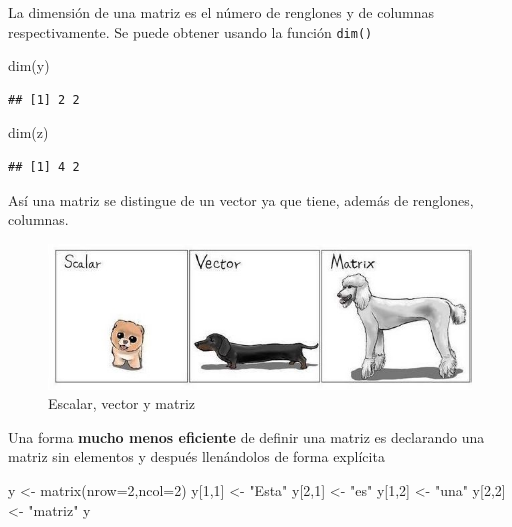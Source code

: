 \documentclass[
]{book}
\newenvironment{Shaded}{\begin{snugshade}}{\end{snugshade}}
\newcommand{\AttributeTok}[1]{\textcolor[rgb]{0.77,0.63,0.00}{#1}}
\newcommand{\DecValTok}[1]{\textcolor[rgb]{0.00,0.00,0.81}{#1}}
\newcommand{\FunctionTok}[1]{\textcolor[rgb]{0.00,0.00,0.00}{#1}}
\newcommand{\NormalTok}[1]{#1}
\newcommand{\OtherTok}[1]{\textcolor[rgb]{0.56,0.35,0.01}{#1}}
\newcommand{\StringTok}[1]{\textcolor[rgb]{0.31,0.60,0.02}{#1}}
\begin{document}
La dimensión de una matriz es el número de renglones y de columnas respectivamente. Se puede obtener usando
la función \texttt{dim()}

\begin{Shaded}
\begin{Highlighting}[]
\FunctionTok{dim}\NormalTok{(y)}
\end{Highlighting}
\end{Shaded}

\begin{verbatim}
## [1] 2 2
\end{verbatim}

\begin{Shaded}
\begin{Highlighting}[]
\FunctionTok{dim}\NormalTok{(z)}
\end{Highlighting}
\end{Shaded}

\begin{verbatim}
## [1] 4 2
\end{verbatim}

Así una matriz se distingue de un vector ya que tiene, además de renglones, columnas.

\begin{figure}
\centering
\includegraphics{Escalar_Vector_Matriz.jpeg}
\caption{Escalar, vector y matriz}
\end{figure}

Una forma \textbf{mucho menos eficiente} de definir una matriz es declarando una matriz sin elementos y después llenándolos de forma explícita

\begin{Shaded}
\begin{Highlighting}[]
\NormalTok{ y }\OtherTok{\textless{}{-}} \FunctionTok{matrix}\NormalTok{(}\AttributeTok{nrow=}\DecValTok{2}\NormalTok{,}\AttributeTok{ncol=}\DecValTok{2}\NormalTok{)}
\NormalTok{y[}\DecValTok{1}\NormalTok{,}\DecValTok{1}\NormalTok{] }\OtherTok{\textless{}{-}} \StringTok{"Esta"}
\NormalTok{y[}\DecValTok{2}\NormalTok{,}\DecValTok{1}\NormalTok{] }\OtherTok{\textless{}{-}} \StringTok{"es"}
\NormalTok{y[}\DecValTok{1}\NormalTok{,}\DecValTok{2}\NormalTok{] }\OtherTok{\textless{}{-}} \StringTok{"una"}
\NormalTok{y[}\DecValTok{2}\NormalTok{,}\DecValTok{2}\NormalTok{] }\OtherTok{\textless{}{-}} \StringTok{"matriz"}
\NormalTok{y}
\end{Highlighting}
\end{Shaded}
\end{document}
